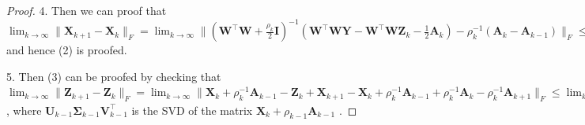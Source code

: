 \documentclass[10pt,twocolumn,letterpaper]{article}
\begin{document}
\begin{proof}
4. Then we can proof that 
$
\lim_{k \to \infty} 
\|
\mathbf{X}_{k+1}
-
\mathbf{X}_{k}
\|_{F}
=
\lim_{k \to \infty} 
\|
(\mathbf{W}^{\top}\mathbf{W}
+
\frac{\rho_{k}}{2}
\mathbf{I})^{-1}
(\mathbf{W}^{\top}\mathbf{W}\mathbf{Y}
-
\mathbf{W}^{\top}\mathbf{W}\mathbf{Z}_{k}
-
\frac{1}{2}
\mathbf{A}_{k})
-
\rho_{k}^{-1}
(\mathbf{A}_{k}-\mathbf{A}_{k-1})
\|_{F}
\le
\lim_{k \to \infty} 
\|
(\mathbf{W}^{\top}\mathbf{W}
+
\frac{\rho_{k}}{2}
\mathbf{I})^{-1}
(\mathbf{W}^{\top}\mathbf{W}\mathbf{Y}
-
\mathbf{W}^{\top}\mathbf{W}\mathbf{Z}_{k}
-
\frac{1}{2}
\mathbf{A}_{k})
\|_{F}
+
\rho_{k}^{-1}\|
\mathbf{A}_{k}-\mathbf{A}_{k-1}
\|_{F}
=
0
$
and hence (2) is proofed. 

5. Then (3) can be proofed by checking that 
$
\lim_{k \to \infty} 
\|
\mathbf{Z}_{k+1}-\mathbf{Z}_{k}
\|_{F}
=
\lim_{k \to \infty} 
\|
\mathbf{X}_{k}+\rho_{k}^{-1}\mathbf{A}_{k-1}-\mathbf{Z}_{k}
+
\mathbf{X}_{k+1}-\mathbf{X}_{k}
+
\rho_{k}^{-1}
\mathbf{A}_{k-1}
+
\rho_{k}^{-1}
\mathbf{A}_{k}
-
\rho_{k}^{-1}
\mathbf{A}_{k+1}
\|_{F}
\le
\lim_{k \to \infty} 
\|
\mathbf{\Sigma}_{k-1}-\mathcal{S}_{\bm{w}/\rho_{k-1}}(\mathbf{\Sigma}_{k-1})
\|_{F}
+
\|
\mathbf{X}_{k+1}-\mathbf{X}_{k}
\|_{F}
+
\rho_{k}^{-1}
\|
\mathbf{A}_{k-1}
+
\mathbf{A}_{k+1}
-
\mathbf{A}_{k}
\|_{F}
=
0
$
,
where $\mathbf{U}_{k-1}\mathbf{\Sigma}_{k-1}\mathbf{V}_{k-1}^{\top}$ is the SVD of the matrix $\mathbf{X}_{k}+\rho_{k-1}\mathbf{A}_{k-1}$
.
\end{proof}


{
\small


}
\end{document}
